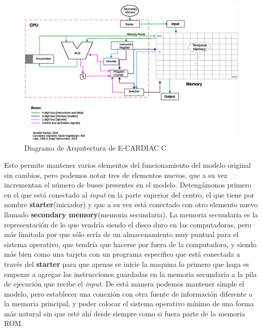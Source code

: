 \documentclass[letterpaper,12pt,oneside]{book}
\begin{document}
		\begin{figure}[h]		
			\centering
			\includegraphics[scale=0.5]{media/CARDIACC/Arquitectura_diagrama_concurrente.eps}
			\caption{Diagrama de Arquitectura de E-CARDIAC C}
			\label{fig:diagarquiConc}
		\end{figure}
		
		
		Esto permite mantener varios elementos del funcionamiento del modelo original sin cambios, pero podemos notar tres de elementos nuevos, que a su vez
		incrementan el número de buses presentes en el modelo. Detengámonos primero en el que está conectado al \textit{input} en la parte superior del centro,
		el que tiene por nombre \textbf{starter}(iniciador) y que a su vez está conectado con otro elemento nuevo llamado \textbf{secondary memory}(memoria secundaria).
		La memoria secundaria es la representación de lo que vendría siendo el disco duro en las computadoras, pero más limitada por que sólo sería de un almacenamiento
		muy puntual para el sistema operativo, que tendría que hacerse por fuera de la computadora, y siendo más bien como una tarjeta con un programa especifico que
		está conectada a través del \textbf{starter} para que apenas se inicie la maquina lo primero que haga es empezar a agregar las instrucciones guardadas
		en la memoria secundaria a la pila de ejecución que recibe el \textit{input}. De está manera podemos mantener simple el modelo, pero establecer una conexión
		con otra fuente de información diferente a la memoria principal, y poder colocar el sistema operativo mínimo de una forma más natural sin que esté ahí
		desde siempre como si fuera parte de la memoria ROM.
		
\end{document}
